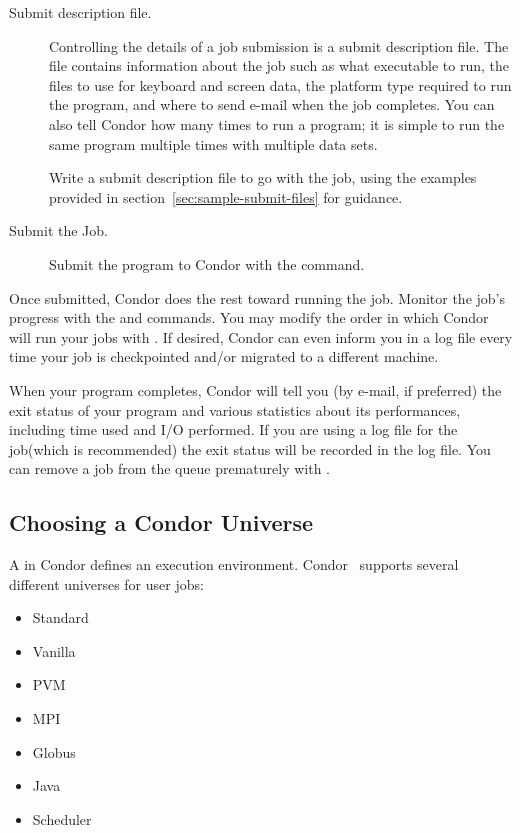 \begin{description}
\item[Submit description file.]
Controlling the details of a job submission is a
submit description file.
The file contains information
about the job such as what executable to run, the
files to use for keyboard and screen data,
the platform type required to run the program, and
where to send e-mail when the job completes.
You can also tell Condor how many times to run a program;
it is simple to run the same program
multiple times with multiple data sets.

Write a submit description file to go with the job, using
the examples provided in section~\ref{sec:sample-submit-files}
for guidance.

\item[Submit the Job.]Submit the program to Condor with
the  command.

\end{description}

Once submitted, Condor does the rest toward running
the job.
Monitor the job's progress with the 
and  commands.
You may modify the order in which Condor will run your jobs with
. If desired, Condor can even inform you in a log file 
every time your job is checkpointed and/or migrated to a different machine. 

When your program completes, Condor will tell you
(by e-mail, if preferred) the exit status of your program and various
statistics about its performances, including time used and I/O performed.
If you are using a log file for the job(which is recommended) the exit
status will be recorded in the log file.
You can remove a job from the
queue prematurely with . 


\subsection{\label{sec:Choosing-Universe}
Choosing a Condor Universe}

A  in Condor
defines an execution environment. 
Condor \VersionNotice\ supports several different
universes for user jobs:
\begin{itemize}
	\item Standard
	\item Vanilla
	\item PVM
 	\item MPI
	\item Globus
	\item Java
	\item Scheduler
\end{itemize}

